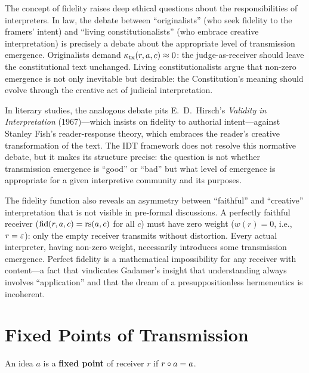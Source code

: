 \begin{remark}\label{rem:ch7:fidelity_ethics}
The concept of fidelity raises deep ethical questions about the
responsibilities of interpreters. In law, the debate between
``originalists'' (who seek fidelity to the framers' intent) and ``living
constitutionalists'' (who embrace creative interpretation) is precisely
a debate about the appropriate level of transmission emergence.
Originalists demand $\kappa_{\text{tx}}(r, a, c) \approx 0$: the
judge-as-receiver should leave the constitutional text unchanged.
Living constitutionalists argue that non-zero emergence is not only
inevitable but desirable: the Constitution's meaning should evolve
through the creative act of judicial interpretation.

In literary studies, the analogous debate pits E.~D.~Hirsch's
\emph{Validity in Interpretation} (1967)---which insists on fidelity
to authorial intent---against Stanley Fish's reader-response theory,
which embraces the reader's creative transformation of the text. The
IDT framework does not resolve this normative debate, but it makes its
structure precise: the question is not whether transmission emergence
is ``good'' or ``bad'' but what level of emergence is appropriate for
a given interpretive community and its purposes.

The fidelity function also reveals an asymmetry between ``faithful''
and ``creative'' interpretation that is not visible in pre-formal
discussions. A perfectly faithful receiver ($\mathrm{fid}(r, a, c) =
\mathrm{rs}(a, c)$ for all $c$) must have zero weight ($w(r) = 0$, i.e.,
$r = \varepsilon$): only the empty receiver transmits without distortion.
Every actual interpreter, having non-zero weight, necessarily introduces
some transmission emergence. Perfect fidelity is a mathematical
impossibility for any receiver with content---a fact that vindicates
Gadamer's insight that understanding always involves ``application''
and that the dream of a presuppositionless hermeneutics is incoherent.
\end{remark}

\section{Fixed Points of Transmission}

\begin{definition}
An idea $a$ is a \textbf{fixed point} of receiver $r$ if
$r \circ a = a$.
\end{definition}

